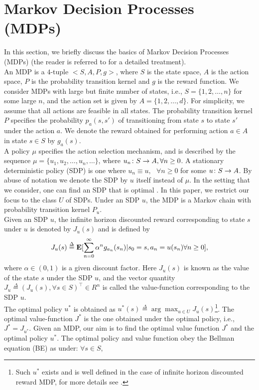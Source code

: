 \documentclass[12pt,draftcls,onecolumn]{IEEEtran}
\begin{document}
\section{Markov Decision Processes (MDPs)}
In this section, we briefly discuss the basics of Markov Decision Processes (MDPs) (the reader is referred to \cite{BertB,Puter} for a detailed treatment).\\
An MDP is a $4$-tuple $<S,A,P,g>$, where $S$ is the state space, $A$ is the action space, $P$ is the probability transition kernel and $g$ is the reward function. We consider MDPs with large but finite number of states, i.e., $S=\{1,2,\ldots,n\}$ for some large $n$, and the action set is given by $A=\{1,2,\ldots,d\}$. For simplicity, we assume that all actions are feasible in all states. The probability transition kernel $P$ specifies the probability $p_a(s,s')$ of transitioning from state $s$ to state $s'$ under the action $a$. We denote the reward obtained for performing action $a\in A$ in state $s\in S$ by $g_a(s)$.\\
A policy $\mu$ specifies the action selection mechanism, and is described by the sequence $\mu=\{u_1,u_2,\ldots,u_n,\ldots\}$, where $u_n\colon S \rightarrow A, \relax{ }\forall n \geq 0$. A stationary deterministic policy (SDP) is one where $u_n\equiv u, \mbox{ }\forall n\geq 0$ for some $u\colon S \rightarrow A$. By abuse of notation we denote the SDP by $u$ itself instead of $\mu$. In the setting that we consider, one can find an SDP that is optimal \cite{BertB,Puter}. In this paper, we restrict our focus to the class $U$ of SDPs.  Under an SDP $u$, the MDP is a Markov chain with probability transition kernel $P_u$.\\
Given an SDP $u$, the infinite horizon discounted reward corresponding to state $s$ under $u$ is denoted by $J_u(s)$ and is defined by
\begin{align}
J_u(s)\stackrel{\Delta}{=}\mathbf{E}[\sum_{n=0}^\infty \alpha^n g_{a_n}(s_n)|s_0=s,a_n=u(s_n)\relax{ }\forall n\geq 0],\nonumber
\end{align}
where $\alpha \in (0,1)$ is a given discount factor. Here $J_u(s)$ is known as the value of the state $s$ under the SDP $u$, and the vector quantity $J_u\stackrel{\Delta}{=}(J_u(s), \forall s\in S)^\top\in R^n$ is called the value-function corresponding to the SDP $u$.\\
The optimal policy $u^*$ is obtained as $u^*(s)\stackrel{\Delta}{=}\arg\max_{u\in U}J_u(s)$\footnote{Such $u^*$ exists and is well defined in the case of infinite horizon discounted reward MDP, for more details see \cite{Puter}.}. The optimal value-function $J^*$ is the one obtained under the optimal policy, i.e., $J^*=J_{u^*}$. Given an MDP, our aim is to find the optimal value function $J^*$ and the optimal policy $u^*$. The optimal policy and value function obey the Bellman equation (BE) as under: $\forall s \in S$,
\end{document}
